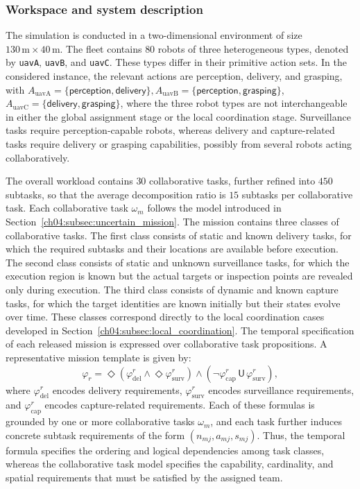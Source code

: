 \subsubsection{Workspace and system description}
\label{ch04:subsubsec:case_large_scale_workspace}

The simulation is conducted in a two-dimensional environment of size
$130\,\mathrm{m} \times 40\,\mathrm{m}$. The fleet contains
$80$ robots of three heterogeneous types, denoted by \texttt{uavA},
\texttt{uavB}, and \texttt{uavC}. These types differ in their
primitive action sets. In the considered instance, the relevant actions
are perception, delivery, and grasping, with
$A_{\mathrm{uavA}} = \{\textsf{perception},\textsf{delivery}\},
A_{\mathrm{uavB}} = \{\textsf{perception},\textsf{grasping}\}$,
$A_{\mathrm{uavC}} = \{\textsf{delivery},\textsf{grasping}\}$,
where the three robot types are not interchangeable in either the
global assignment stage or the local coordination stage. Surveillance
tasks require perception-capable robots, whereas delivery and
capture-related tasks require delivery or grasping capabilities,
possibly from several robots acting collaboratively.

The overall workload contains $30$ collaborative tasks, further
refined into $450$ subtasks, so that the average decomposition ratio
is $15$ subtasks per collaborative task. Each collaborative task
$\omega_m$ follows the model introduced in
Section~\ref{ch04:subsec:uncertain_mission}.
The mission contains three
classes of collaborative tasks. The first class consists of static and
known delivery tasks, for which the required subtasks and their
locations are available before execution. The second class consists of
static and unknown surveillance tasks, for which the execution region
is known but the actual targets or inspection points are revealed only
during execution. The third class consists of dynamic and known
capture tasks, for which the target identities are known initially but
their states evolve over time. These classes correspond directly to the
local coordination cases developed in
Section~\ref{ch04:subsec:local_coordination}.
The temporal specification of each released mission is expressed over
collaborative task propositions. A representative mission template is
given by:
\[ \varphi_r =
\Diamond\!\left(
\varphi^r_{\mathrm{del}}
\wedge
\Diamond \varphi^r_{\mathrm{surv}}
\right)
\wedge
\left(
\neg \varphi^r_{\mathrm{cap}}\,
\mathsf{U}\,
\varphi^r_{\mathrm{surv}}
\right),
\]
where $\varphi^r_{\mathrm{del}}$ encodes delivery requirements,
$\varphi^r_{\mathrm{surv}}$ encodes surveillance requirements, and
$\varphi^r_{\mathrm{cap}}$ encodes capture-related requirements.
Each of these formulas is grounded by one or more collaborative tasks
$\omega_m$, and each task further induces concrete subtask
requirements of the form $(n_{mj},a_{mj},s_{mj})$. Thus, the
temporal formula specifies the ordering and logical dependencies among
task classes, whereas the collaborative task model specifies the
capability, cardinality, and spatial requirements that must be
satisfied by the assigned team.

